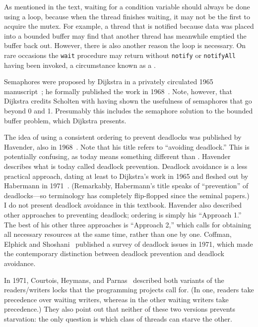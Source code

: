 As mentioned in the text, waiting for a condition variable should always be done using a loop,
because when the thread finishes waiting, it may not be the first
to acquire the mutex.  For example, a thread that is notified because
data was placed into a bounded buffer may find that another thread has
meanwhile emptied the buffer back out.  However, there is also another reason the loop is necessary. On rare occasions the \texttt{wait} procedure may return without \verb|notify| or \verb|notifyAll| having been invoked, a circumstance known as a .

Semaphores were proposed by Dijkstra in a privately circulated 1965
manuscript~\cite{max987}; he formally published the work in
1968~\cite{max988}.  Note, however, that Dijkstra credits
Scholten
with having shown the usefulness of semaphores that go beyond 0 and
1.  Presumably this includes the semaphore solution to the bounded
buffer problem, which Dijkstra presents.

The idea of using a consistent ordering to prevent deadlocks was
published by Havender, also in 1968~\cite{max989}.  Note that his
title refers to ``avoiding deadlock.''  This is potentially confusing,
as today  means something different than
.  Havender describes what is today called
deadlock prevention.  Deadlock avoidance is a less practical approach,
dating at least to Dijkstra's work in 1965 and fleshed out by
Habermann in 1971~\cite{max999}. (Remarkably, Habermann's title speaks
of ``prevention'' of deadlocks---so terminology has completely
flip-flopped since the seminal papers.)  I do not present deadlock
avoidance in this textbook.  Havender also described other approaches
to preventing deadlock; ordering is simply his ``Approach 1.''  The
best of his other three approaches is ``Approach 2,'' which calls for
obtaining all necessary resources at the same time, rather than one by
one.  Coffman, Elphick and Shoshani~\cite{max998} published a survey
of deadlock issues in 1971, which made the contemporary distinction
between deadlock prevention and deadlock avoidance.

In 1971, Courtois,
Heymans, and Parnas~\cite{max997} described both
variants of the readers/writers locks
that the programming projects call for.  (In
one, readers take precedence over waiting writers, whereas in the
other waiting writers take precedence.)  They also point out that
neither of these two versions prevents starvation: the only question
is which class of threads can starve the other.


